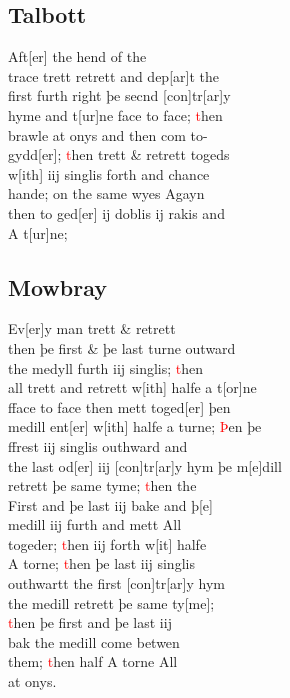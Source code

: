 \documentclass[12pt,letter]{article} %
\newcommand{\red}[1]{\textcolor{red}{#1}}
\newcommand{\srcpg}[1]{
    \noindent{
        \color{Gray}{\rule[0.5ex]{\linewidth}{1pt}~#1} 
        \\
    }
}
\begin{document}
    \subsection{Talbott}
Aft{[}er{]} the hend of the \\ 
trace trett retrett and dep{[}ar{]}t the \\ 
first furth right þe secnd {[}con{]}tr{[}ar{]}y \\ 
hyme and t{[}ur{]}ne face to face; \red{t}hen \\ 
brawle at onys and then com to-\\ 
gydd{[}er{]}; \red{t}hen trett \& retrett togeds \\ 
w{[}ith{]} iij singlis forth and chance \\
hande; on the same wyes Agayn \\ 
then to ged{[}er{]} ij doblis ij rakis and \\ 
A t{[}ur{]}ne;

    \subsection{Mowbray}
Ev{[}er{]}y man trett \& retrett \\ 
then þe first \& þe last turne outward \\ 
the medyll furth iij singlis; \red{t}hen \\ 
\srcpg{56} all trett and retrett w{[}ith{]} halfe a t{[}or{]}ne \\ 
fface to face then mett toged{[}er{]} þen \\
medill ent{[}er{]} w{[}ith{]} halfe a turne; \red{Þ}en þe \\
 ffrest iij singlis outhward and \\
the last od{[}er{]} iij {[}con{]}tr{[}ar{]}y hym þe m{[}e{]}dill \\ 
retrett þe same tyme; \red{t}hen the \\
First and þe last iij bake and þ[e] \\
medill iij furth and mett All \\ 
togeder; \red{t}hen iij forth w{[}it{]} halfe \\ 
A torne; \red{t}hen þe last iij singlis \\ 
outhwartt the first {[}con{]}tr{[}ar{]}y hym \\ 
the medill retrett þe same ty[me]; \\ 
\red{t}hen þe first and þe last iij \\
bak the medill come betwen \\ 
them; \red{t}hen half A torne All \\ at onys.
\end{document}
